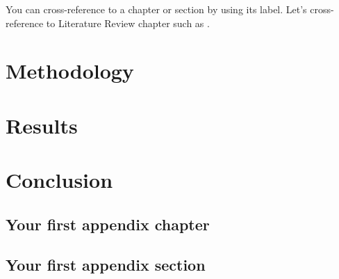 \documentclass{template}
\begin{document}
You can cross-reference to a chapter or section by using its label. Let's cross-reference to Literature Review chapter such as .

\chapter{Methodology}
\chapter{Results}
\chapter{Conclusion}



\begin{appendices}
\chapter{Your first appendix chapter}
\section{Your first appendix section}
\end{appendices}
\end{document}

